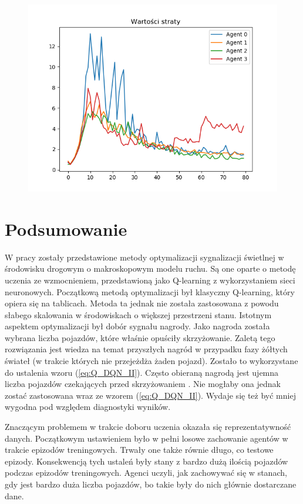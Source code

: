 \documentclass[12pt]{book}
\theoremstyle{plain}
\newcommand{\myref}[1]{(\ref{#1})}
\begin{document}
\begin{figure}[H]
	\centering
	\includegraphics[width=14cm]{images/poli_wyniki/losses}
	\label{fig:losses}
	\centering
\end{figure}

\chapter{Podsumowanie}

\indent \indent W pracy zostały przedstawione metody optymalizacji sygnalizacji świetlnej w środowisku drogowym o makroskopowym modelu ruchu. Są one oparte o metodę uczenia ze wzmocnieniem, przedstawioną jako Q-learning z wykorzystaniem sieci neuronowych. Początkową metodą optymalizacji był klasyczny Q-learning, który opiera się na tablicach. Metoda ta jednak nie została zastosowana z powodu słabego skalowania w środowiskach o większej przestrzeni stanu. Istotnym aspektem optymalizacji był dobór sygnału nagrody. Jako nagroda została wybrana liczba pojazdów, które właśnie opuściły skrzyżowanie. Zaletą tego rozwiązania jest wiedza na temat przyszłych nagród w przypadku fazy żółtych świateł (w trakcie których nie przejeżdża żaden pojazd). Zostało to wykorzystane do ustalenia wzoru \myref{eq:Q_DQN_II}. Często obieraną nagrodą jest ujemna liczba pojazdów czekających przed skrzyżowaniem \cite{rewards}. Nie mogłaby ona jednak zostać zastosowana wraz ze wzorem \myref{eq:Q_DQN_II}. Wydaje się  też być mniej wygodna pod względem diagnostyki wyników. 

Znaczącym problemem w trakcie doboru uczenia okazała się reprezentatywność danych. Początkowym ustawieniem było w pełni losowe zachowanie agentów w trakcie epizodów treningowych. Trwały one także równie długo, co testowe epizody. Konsekwencją tych ustaleń były stany z bardzo dużą ilością pojazdów podczas epizodów treningowych. Agenci uczyli, jak zachowywać się w stanach,  gdy jest bardzo duża liczba pojazdów, bo takie były do nich głównie dostarczane dane. 
\end{document}
